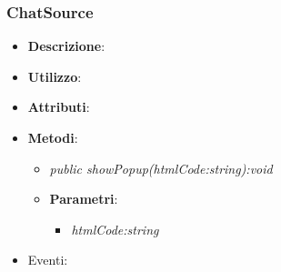 \subsubsection{ChatSource}
\begin{itemize}
\item \textbf{Descrizione}: 
\item \textbf{Utilizzo}:
\item \textbf{Attributi}: 
\item \textbf{Metodi}:
	\begin{itemize}
	\item \textit{public showPopup(htmlCode:string):void}\\
	
			\item{\textbf{Parametri}: \begin{itemize}
			\item \textit{htmlCode:string}\\

			\end{itemize}}
	\end{itemize}
\item{Eventi}:
\end{itemize}

